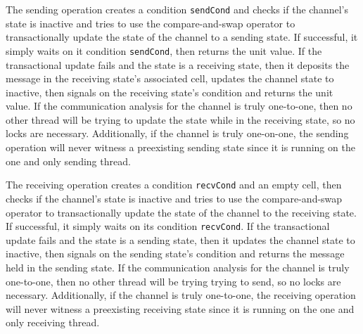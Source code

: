 \documentclass[10pt]{article}
\begin{document}
The sending operation creates a condition \lstinline{sendCond} and checks
if the channel's state is inactive and tries to use the
compare-and-swap operator to transactionally update the state of the channel to a
sending state.
If successful, it simply waits on it condition \lstinline{sendCond}, then returns the unit value.
If the transactional update fails and the state is a receiving state,
then it deposits the message in the receiving state's associated cell,
updates the channel state to inactive, then signals on the receiving state's 
condition and returns the unit value.
If the communication analysis for the channel is
truly one-to-one, then no other thread will be trying to update the state while in
the receiving state, so no locks are necessary.
Additionally, if the channel is truly one-on-one, the sending operation will never
witness a preexisting sending state since it is running on the one and only sending thread. 

The receiving operation creates a condition \lstinline{recvCond} and an empty cell,
then checks if the channel's state is inactive and tries to use the
compare-and-swap operator to transactionally update the state of the channel to
the receiving state.  If successful, it simply waits on its condition \lstinline{recvCond}.
If the transactional update fails and the state is a sending state,
then it updates the channel state to inactive, then signals on the sending state's
condition and returns the message held in the sending state.
If the communication
analysis for the channel is truly one-to-one, then no other thread will be trying
trying to send, so no locks are necessary.
Additionally, if the channel is truly one-to-one, the receiving operation will never
witness a preexisting receiving state since it is running on the one and only receiving thread.
\end{document}
